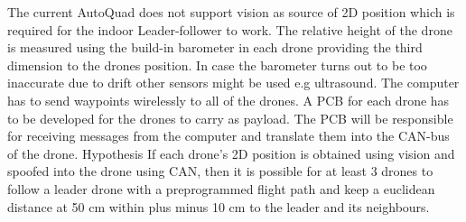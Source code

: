 The current AutoQuad does not support vision as source of 2D position which is required for the indoor Leader-follower to work. The relative height of the drone is measured using the build-in barometer in each drone providing the third dimension to the drones position. In case the barometer turns out to be too inaccurate due to drift other sensors might be used e.g ultrasound. The computer has to send waypoints wirelessly to all of the drones. A PCB for each drone has to be developed for the drones to carry as payload. The PCB will be responsible for receiving messages from the computer and translate them into the CAN-bus of the drone.
Hypothesis
If each drone’s 2D position is obtained using vision and spoofed into the drone using CAN, then it is possible for at least 3 drones to follow a leader drone with a preprogrammed flight path and keep a euclidean distance at 50 cm within plus minus 10 cm to the leader and its neighbours.
